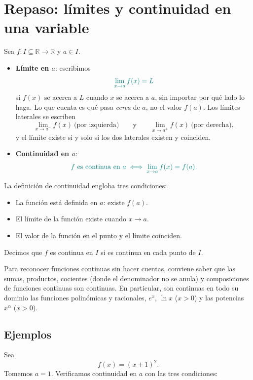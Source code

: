 \documentclass{article}
\begin{document}
\section*{Repaso: límites y continuidad en una variable}
Sea \(f\colon I\subseteq \mathbb{R}\to\mathbb{R}\) y \(a\in I\).
\begin{itemize}
  \item \textbf{{\color{teal}Límite en \(a\)}}: escribimos
  \[\color{teal}
    \lim_{x\to a} f(x)=L
  \]
  si \(f(x)\) se acerca a \(L\) cuando \(x\) se acerca a \(a\), sin importar por qué lado lo haga. Lo que cuenta es qué pasa \emph{cerca} de \(a\), no el valor \(f(a)\). Los límites laterales se escriben
  \[
    \lim_{x\to a^-}f(x)\ \text{(por izquierda)}
    \qquad\text{y}\qquad
    \lim_{x\to a^+}f(x)\ \text{(por derecha)},
  \]
  y {\color{teal}el límite existe si y solo si los dos laterales existen y coinciden}.

  \item \textbf{{\color{teal}Continuidad en \(a\)}}:
  \[\color{teal}
    f \text{ es continua en } a
    \;\Longleftrightarrow\;
    \lim_{x\to a} f(x)=f(a).
  \]
\end{itemize}
La definición de continuidad engloba tres condiciones:
\begin{itemize}
    \item {\color{teal}La función está definida en \(a\): existe \(f(a)\).}
    \item {\color{teal}El límite de la función existe cuando \(x\to a\).}
    \item {\color{teal}El valor de la función en el punto y el límite coinciden.}
\end{itemize}
Decimos que \(f\) es {\color{teal}continua en \(I\)} si es continua en cada punto de \(I\).

Para reconocer funciones continuas sin hacer cuentas, conviene saber que {\color{teal}las sumas, productos, cocientes (donde el denominador no se anula) y composiciones de funciones continuas son continuas}. En particular, son continuas en todo su dominio las funciones polinómicas y racionales, \(e^{x}\), \(\ln x\) (\(x>0\)) y las potencias \(x^{\alpha}\) (\(x>0\)).


\subsection*{Ejemplos}

Sea
\[
f(x)=(x+1)^2.
\]
Tomemos \(a=1\). Verificamos continuidad en \(a\) con las tres condiciones:
\end{document}
